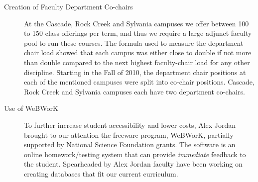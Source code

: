 \begin{description}
  \item[Creation of Faculty Department Co-chairs] At the Cascade, Rock Creek and Sylvania campuses we
    offer between 100 to 150 class offerings per term, and
    thus we require a large adjunct faculty pool to run these courses.    The
    formula used to measure the department chair load showed that each campus
    was either close to double if not more than double compared to the next
    highest faculty-chair load for any other discipline.   Starting in the Fall
    of 2010, the department chair positions at each of the mentioned campuses
    were split into co-chair positions.   Cascade, Rock Creek and Sylvania
    campuses each have two department co-chairs.
  \item[Use of WeBWorK] To further increase student accessibility and lower costs,
Alex Jordan brought to our attention the freeware program,
    WeBWorK,  partially supported by  National Science Foundation grants.    The
    software is an online homework/testing
    system that can provide \emph{immediate} feedback to the student.   Spearheaded by Alex
    Jordan faculty have been working on creating databases that fit our current
    curriculum. 
    

\end{description}

